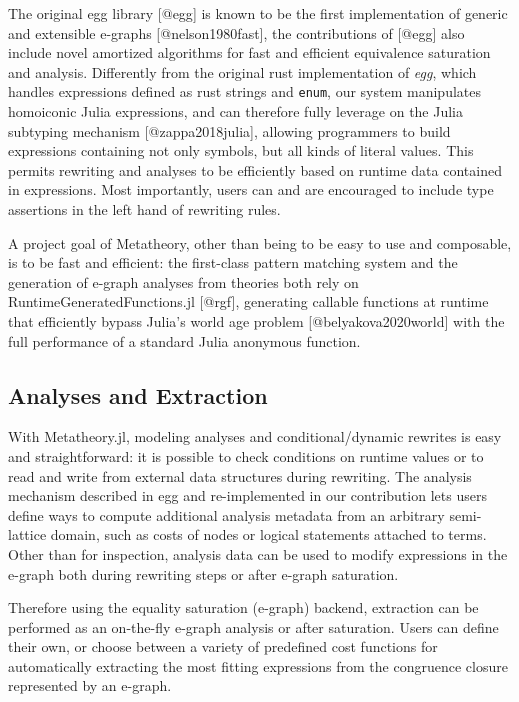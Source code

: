 \documentclass[
]{article}
\begin{document}
The original egg library {[}@egg{]} is known to be the first
implementation of generic and extensible e-graphs {[}@nelson1980fast{]},
the contributions of {[}@egg{]} also include novel amortized algorithms
for fast and efficient equivalence saturation and analysis. Differently
from the original rust implementation of \emph{egg}, which handles
expressions defined as rust strings and \texttt{enum}, our system
manipulates homoiconic Julia expressions, and can therefore fully
leverage on the Julia subtyping mechanism {[}@zappa2018julia{]},
allowing programmers to build expressions containing not only symbols,
but all kinds of literal values. This permits rewriting and analyses to
be efficiently based on runtime data contained in expressions. Most
importantly, users can and are encouraged to include type assertions in
the left hand of rewriting rules.

A project goal of Metatheory, other than being to be easy to use and
composable, is to be fast and efficient: the first-class pattern
matching system and the generation of e-graph analyses from theories
both rely on RuntimeGeneratedFunctions.jl {[}@rgf{]}, generating
callable functions at runtime that efficiently bypass Julia's world age
problem {[}@belyakova2020world{]} with the full performance of a
standard Julia anonymous function.

\hypertarget{analyses-and-extraction}{%
\subsection{Analyses and Extraction}\label{analyses-and-extraction}}

With Metatheory.jl, modeling analyses and conditional/dynamic rewrites
is easy and straightforward: it is possible to check conditions on
runtime values or to read and write from external data structures during
rewriting. The analysis mechanism described in egg and re-implemented in
our contribution lets users define ways to compute additional analysis
metadata from an arbitrary semi-lattice domain, such as costs of nodes
or logical statements attached to terms. Other than for inspection,
analysis data can be used to modify expressions in the e-graph both
during rewriting steps or after e-graph saturation.

Therefore using the equality saturation (e-graph) backend, extraction
can be performed as an on-the-fly e-graph analysis or after saturation.
Users can define their own, or choose between a variety of predefined
cost functions for automatically extracting the most fitting expressions
from the congruence closure represented by an e-graph.
\end{document}
